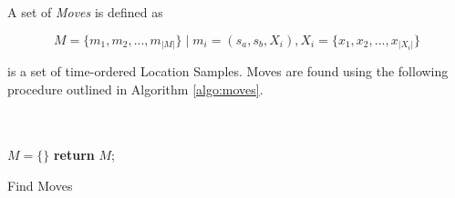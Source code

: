A set of \textit{Moves} is defined as 

\begin{equation}
\label{eq:feature-moves}
M = \{m_1, m_2, ..., m_{|M|}\} \;| \; m_i = (s_a, s_b, X_i), X_i = \{x_1, x_2, ..., x_{|X_i|}\}
\end{equation}

is a set of time-ordered Location Samples. Moves are found using the following procedure outlined in Algorithm \ref{algo:moves}.

\begin{algorithm}[H]
\SetAlgoLined
{}\\
\\
    $M = \{ \}$\;
    \textbf{return} $M$;
 \label{algo:moves}
 \caption{Find Moves}
\end{algorithm}


